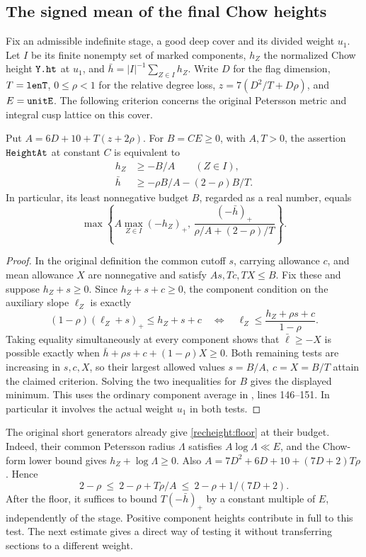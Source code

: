 \subsection{The signed mean of the final Chow heights}\label{recheight:input}

Fix an admissible indefinite stage, a good deep cover and its divided
weight \(u_1\). Let \(I\) be its finite nonempty set of marked
components, \(h_Z\) the normalized Chow height \(\texttt{Y.ht}\) at
\(u_1\), and \(\bar h=|I|^{-1}\sum_{Z\in I}h_Z\). Write \(D\) for the
flag dimension, \(T=\texttt{lenT}\), \(0\le\rho<1\) for the relative
degree loss, \(z=7(D^2/T+D\rho)\), and \(E=\texttt{unitE}\).
The following criterion concerns the original Petersson metric and
integral cusp lattice on this cover.

\begin{proposition}\label{recheight:criterion}
Put \(A=6D+10+T(z+2\rho)\). For \(B=CE\ge0\), with \(A,T>0\),
the assertion \(\texttt{HeightAt}\) at constant \(C\) is equivalent to
\begin{align}
 h_Z&\ge -B/A \qquad(Z\in I),\label{recheight:floor}\\
 \bar h&\ge-\rho B/A-(2-\rho)B/T .\label{recheight:mean}
\end{align}
In particular, its least nonnegative budget \(B\), regarded as a real
number, equals
\[
 \max\left\{A\max_{Z\in I}(-h_Z)_+,\,
       \frac{(-\bar h)_+}{\rho/A+(2-\rho)/T}\right\}.
\]
\end{proposition}
\begin{proof}
In the original definition the common cutoff \(s\), carrying
allowance \(c\), and mean allowance \(X\) are nonnegative and satisfy
\(As,Tc,TX\le B\). Fix these and suppose \(h_Z+s\ge0\).
Since \(h_Z+s+c\ge0\), the component condition on the auxiliary
slope \(\ell_Z\) is exactly
\[
 (1-\rho)(\ell_Z+s)_+\le h_Z+s+c
 \quad\Longleftrightarrow\quad
 \ell_Z\le \frac{h_Z+\rho s+c}{1-\rho}.
\]
Taking equality simultaneously at every component shows that
\(\bar\ell\ge-X\) is possible exactly when
\(\bar h+\rho s+c+(1-\rho)X\ge0\).
Both remaining tests are increasing in \(s,c,X\), so their largest
allowed values \(s=B/A,\ c=X=B/T\) attain the claimed criterion.
Solving the two inequalities for \(B\) gives the displayed minimum.
This uses the ordinary component average in
, lines 146--151. In particular it involves
the actual weight \(u_1\) in both tests.
\end{proof}

The original short generators already give \eqref{recheight:floor}
at their budget. Indeed, their common Petersson radius \(\Lambda\)
satisfies \(A\log\Lambda\ll E\), and the Chow-form lower bound
gives \(h_Z+\log\Lambda\ge0\). Also
\(A=7D^2+6D+10+(7D+2)T\rho\). Hence
\[
  2-\rho\ \le\ 2-\rho+T\rho/A
          \ \le\ 2-\rho+1/(7D+2).
\]
After the floor, it suffices to bound \(T(-\bar h)_+\) by a constant
multiple of \(E\), independently of the stage. Positive component
heights contribute in full to this test. The next estimate gives a
direct way of testing it without transferring sections to a different
weight.

